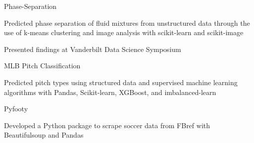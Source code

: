 
\begin{cventries}
  \cventry
    {} %
    {Phase-Separation} %
    {} %
    {} %
    {
      \begin{cvitems} %
        \item {Predicted phase separation of fluid mixtures from unstructured
            data through the use of
            k-means clustering and image analysis with scikit-learn and
              scikit-image}
        \item{Presented findings at Vanderbilt Data Science Symposium}
      \end{cvitems}
    }

  \cventry
    {} %
    {MLB Pitch Classification} %
    {} %
    {} %
    {
      \begin{cvitems} %
      	\item {Predicted pitch types using
            structured data and supervised machine learning algorithms with Pandas,
              Scikit-learn, XGBoost, and
              imbalanced-learn}
      \end{cvitems}
    }

  \cventry
    {} %
    {Pyfooty} %
    {} %
    {} %
    {
      \begin{cvitems} %
      	\item {Developed a Python package to scrape soccer data
            from FBref with Beautifulsoup and Pandas}
      \end{cvitems}
    }
\end{cventries}
